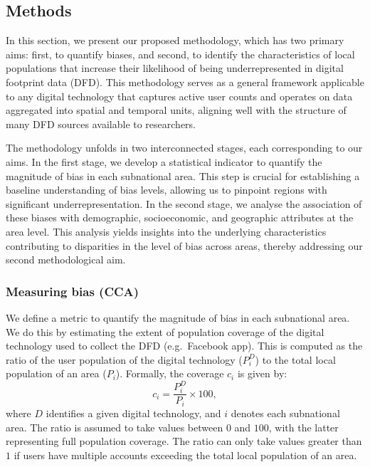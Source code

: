 \documentclass[]{rsos}%
\begin{document}
\subsection{Methods}\label{methods}

In this section, we present our proposed methodology, which has two
primary aims: first, to quantify biases, and second, to identify the
characteristics of local populations that increase their likelihood of
being underrepresented in digital footprint data (DFD). This methodology
serves as a general framework applicable to any digital technology that
captures active user counts and operates on data aggregated into spatial
and temporal units, aligning well with the structure of many DFD sources
available to researchers.

The methodology unfolds in two interconnected stages, each corresponding
to our aims. In the first stage, we develop a statistical indicator to
quantify the magnitude of bias in each subnational area. This step is
crucial for establishing a baseline understanding of bias levels,
allowing us to pinpoint regions with significant underrepresentation. In
the second stage, we analyse the association of these biases with
demographic, socioeconomic, and geographic attributes at the area level.
This analysis yields insights into the underlying characteristics
contributing to disparities in the level of bias across areas, thereby
addressing our second methodological aim.

\subsubsection{Measuring bias (CCA)}\label{measuring-bias-cca}

We define a metric to quantify the magnitude of bias in each subnational
area. We do this by estimating the extent of population coverage of the
digital technology used to collect the DFD (e.g.~Facebook app). This is
computed as the ratio of the user population of the digital technology
(\(P_i^D\)) to the total local population of an area (\(P_i\)). Formally,
the coverage \(c_i\) is given by: \begin{equation}
c_i = \dfrac{P_i^D}{P_i} \times 100,
\end{equation} where \(D\) identifies a given digital technology, and \(i\)
denotes each subnational area. The ratio is assumed to take values
between \(0\) and \(100\), with the latter representing full population
coverage. The ratio can only take values greater than \(1\) if users have
multiple accounts exceeding the total local population of an area.
\end{document}
